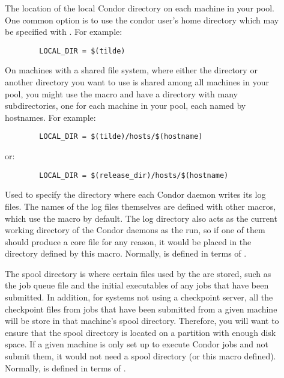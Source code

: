 \begin{description}
\item[] \label{param:LocalDir} The location of the
  local Condor directory on each machine in your pool.  One common
  option is to use the condor user's home directory which may be
  specified with .  For example:
\begin{verbatim}
        LOCAL_DIR = $(tilde)
\end{verbatim}
  
  On machines with a shared file system, where either the
   directory or another directory you want to use is
  shared among all machines in your pool, you might use the
   macro and have a directory with many
  subdirectories, one for each machine in your pool, each named by
  hostnames.  For example:
\begin{verbatim}
        LOCAL_DIR = $(tilde)/hosts/$(hostname)      
\end{verbatim}
  or:
\begin{verbatim}
        LOCAL_DIR = $(release_dir)/hosts/$(hostname)
\end{verbatim}
  
\item[] \label{param:Log} Used to specify the
  directory where each Condor daemon writes its log files.  The names
  of the log files themselves are defined with other macros, which use
  the  macro by default.  The log directory also acts as
  the current working directory of the Condor daemons as the run, so
  if one of them should produce a core file for any reason, it would
  be placed
  in the directory defined by this macro.  Normally,  is
  defined in terms of .
  
\item[] \label{param:Spool} The spool directory is where
  certain files used by the  are stored, such as the
  job queue file and the initial executables of any jobs that have
  been submitted.  In addition, for systems not using a checkpoint
  server, all the checkpoint files from jobs that have been submitted
  from a given machine will be store in that machine's spool
  directory.  Therefore, you will want to ensure that the spool
  directory is located on a partition with enough disk space.  If a
  given machine is only set up to execute Condor jobs and not submit
  them, it would not need a spool directory (or this macro defined).
  Normally,  is defined in terms of
  .
  

\end{description}
